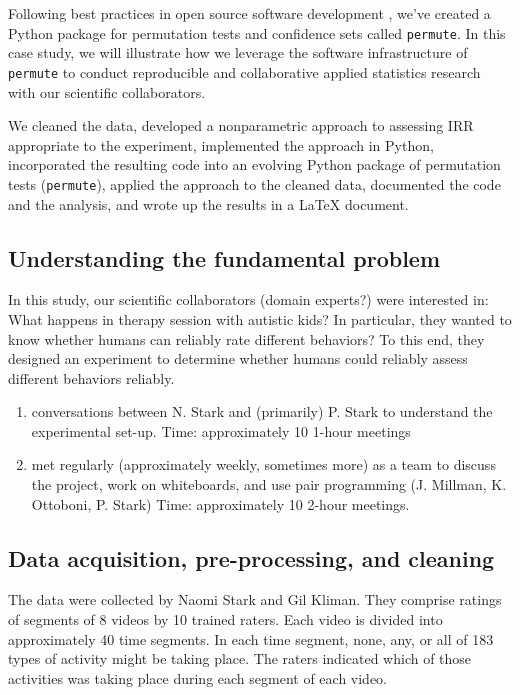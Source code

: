 \documentclass[]{article}
\begin{document}
Following best practices in open source software development
\cite{millman2014developing}, we've created a Python package for permutation
tests and confidence sets called \texttt{permute}.
In this case study, we will illustrate how we leverage the software
infrastructure of \texttt{permute} to conduct reproducible and collaborative
applied statistics research with our scientific collaborators.


We cleaned the data, developed a nonparametric approach to assessing IRR
appropriate to the experiment, implemented the approach in Python,
incorporated the resulting code into an evolving Python package of
permutation tests (\texttt{permute}), applied the approach to the cleaned
data, documented the code and the analysis, and wrote up the results in
a LaTeX document. 

\subsection{Understanding the fundamental problem}

In this study, our scientific collaborators (domain experts?) were interested
in:  What happens in therapy session with autistic kids?
In particular, they wanted to know whether humans can reliably rate different
behaviors?
To this end, they designed an experiment to determine whether humans could
reliably assess different behaviors reliably.


  \begin{enumerate}
  \def\labelenumii{\roman{enumii}.}
  \itemsep1pt\parskip0pt
  \item
    conversations between N. Stark and (primarily) P. Stark to
    understand the experimental set-up. Time: approximately 10 1-hour
    meetings
  \item
    met regularly (approximately weekly, sometimes more) as a team to
    discuss the project, work on whiteboards, and use pair programming
    (J. Millman, K. Ottoboni, P. Stark) Time: approximately 10 2-hour
    meetings.
  \end{enumerate}
  

\subsection{Data acquisition, pre-processing, and cleaning}

The data were collected by Naomi Stark and Gil Kliman. They
comprise ratings of segments of 8 videos by 10 trained raters. Each
video is divided into approximately 40 time segments. In each time
segment, none, any, or all of 183 types of activity might be taking
place. The raters indicated which of those activities was taking place
during each segment of each video.
\end{document}
